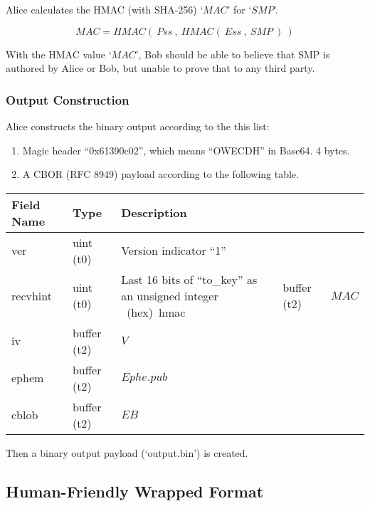 \documentclass[a4paper,11pt]{article}
\begin{document}
Alice calculates the HMAC (with SHA-256) `$MAC$' for `$SMP$'.

\begin{displaymath}
	MAC = HMAC(~Pss~,~HMAC(~Ess~,~SMP~)~)
\end{displaymath}

With the HMAC value `$MAC$', Bob should be able to believe that SMP is authored by Alice or Bob,
but unable to prove that to any third party.

\subsubsection{Output Construction}

Alice constructs the binary output according to the this list:

\begin{enumerate}
	\item Magic header ``0x61390c02'', which means ``OWECDH'' in Base64. 4 bytes.
	\item A CBOR (RFC 8949) payload according to the following table.
\end{enumerate}

\begin{center}
	\begin{tabu}{lll}
		\toprule
		Field Name & Type          & Description                                          \\
		\midrule
		{ver}      & {uint (t0)}   & {Version indicator ``1''}                            \\
		{recvhint} & {uint (t0)}   & {Last 16 bits of ``to\_key'' as an unsigned integer} \ (hex)\
		{hmac}     & {buffer (t2)} & {$MAC$}                                              \\
		{iv}       & {buffer (t2)} & {$V$}                                                \\
		{ephem}    & {buffer (t2)} & {$Ephe.pub$}                                         \\
		{cblob}    & {buffer (t2)} & {$EB$}                                               \\
		\bottomrule
	\end{tabu}
\end{center}

Then a binary output payload (`output.bin') is created.

\subsection{Human-Friendly Wrapped Format}
\end{document}
